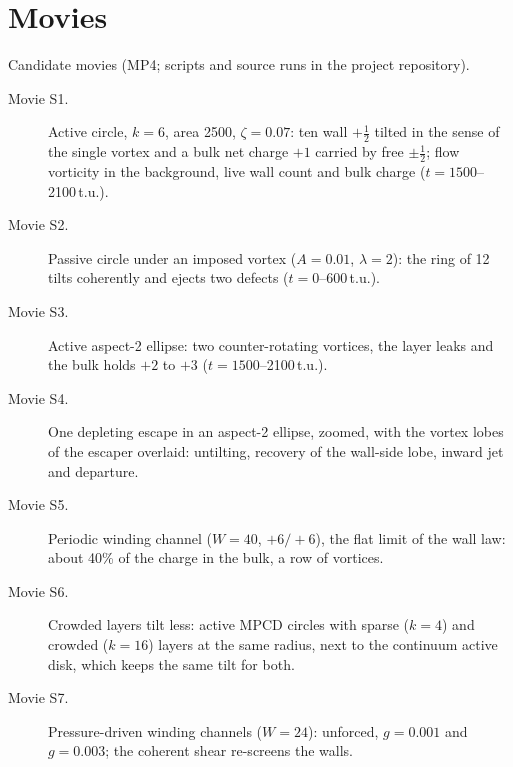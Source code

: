 \documentclass[aps,prl,onecolumn,superscriptaddress,amsmath,amssymb,nofootinbib]{revtex4-2}
\newcommand{\half}{\tfrac12}
\begin{document}
\section{Movies}\label{si:movies}
Candidate movies (MP4; scripts and source runs in the project repository).
\begin{description}
\item[Movie S1.] Active circle, $k=6$, area 2500, $\zeta=0.07$: ten wall $+\half$ tilted in the sense of the single vortex and a bulk net charge $+1$ carried by free $\pm\half$; flow
vorticity in the background, live wall count and bulk charge ($t=1500$--2100\,t.u.).
\item[Movie S2.] Passive circle under an imposed vortex ($A=0.01$, $\lambda=2$): the ring of 12 tilts coherently and ejects two defects ($t=0$--600\,t.u.).
\item[Movie S3.] Active aspect-2 ellipse: two counter-rotating vortices, the layer leaks and the bulk holds $+2$ to $+3$ ($t=1500$--2100\,t.u.).
\item[Movie S4.] One depleting escape in an aspect-2 ellipse, zoomed, with the vortex lobes of the escaper overlaid: untilting, recovery of the wall-side lobe, inward jet and departure.
\item[Movie S5.] Periodic winding channel ($W=40$, $+6/+6$), the flat limit of the wall law: about 40\% of the charge in the bulk, a row of vortices.
\item[Movie S6.] Crowded layers tilt less: active MPCD circles with sparse ($k=4$) and crowded ($k=16$) layers at the same radius, next to the continuum active disk, which keeps the same
tilt for both.
\item[Movie S7.] Pressure-driven winding channels ($W=24$): unforced, $g=0.001$ and $g=0.003$; the coherent shear re-screens the walls.
\end{description}


\end{document}
